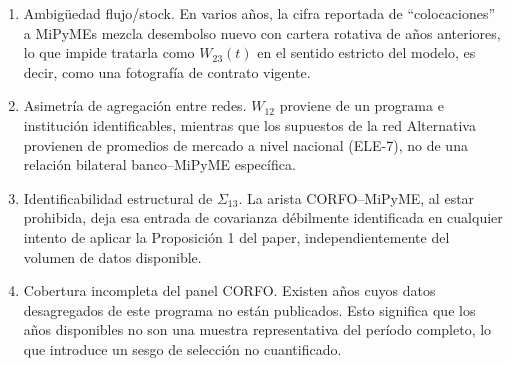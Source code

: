 \begin{enumerate}
    \item Ambigüedad flujo/stock. En varios años, la cifra reportada de ``colocaciones'' a MiPyMEs mezcla desembolso nuevo con cartera rotativa de años anteriores, lo que impide tratarla como $W_{23}(t)$ en el sentido estricto del modelo, es decir, como una fotografía de contrato vigente.
    \item Asimetría de agregación entre redes. $W_{12}$ proviene de un programa e institución identificables, mientras que los supuestos de la red Alternativa provienen de promedios de mercado a nivel nacional (ELE-7), no de una relación bilateral banco--MiPyME específica.
    \item Identificabilidad estructural de $\Sigma_{13}$. La arista CORFO--MiPyME, al estar prohibida, deja esa entrada de covarianza débilmente identificada en cualquier intento de aplicar la Proposición 1 del paper, independientemente del volumen de datos disponible.
    \item Cobertura incompleta del panel CORFO. Existen años cuyos datos desagregados de este programa no están publicados. Esto significa que los años disponibles no son una muestra representativa del período completo, lo que introduce un sesgo de selección no cuantificado.
\end{enumerate}
